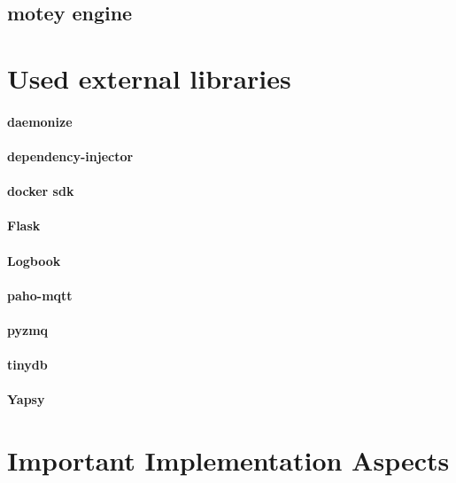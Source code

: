 \subsection{motey engine}

\section{Used external libraries}
\paragraph{daemonize}
\paragraph{dependency-injector}
\paragraph{docker sdk}
\paragraph{Flask}
\paragraph{Logbook}
\paragraph{paho-mqtt}
\paragraph{pyzmq}
\paragraph{tinydb}
\paragraph{Yapsy}
\doit

\section{Important Implementation Aspects}

